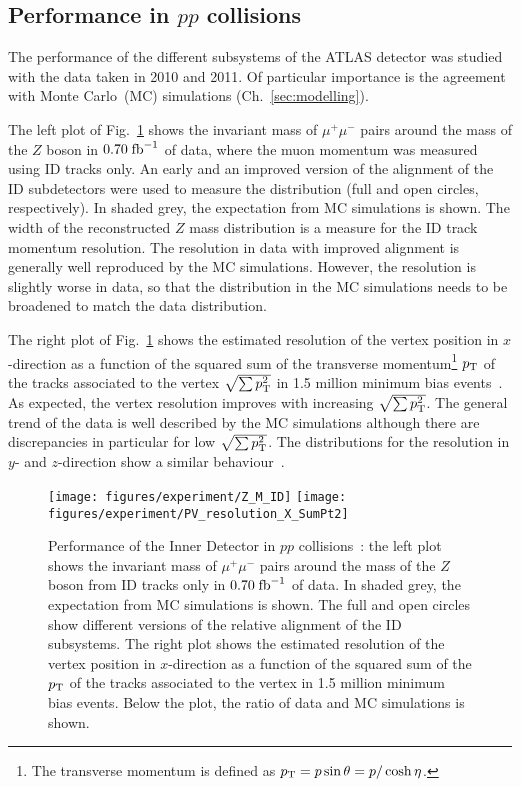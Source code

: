 \subsection[Performance in $pp$ collisions]{Performance in \boldmath$pp$ collisions\unboldmath}
\label{sec:performance}

The performance of the different subsystems of the ATLAS detector was studied with the data taken in 2010 and 2011.
Of particular importance is the agreement with Monte Carlo~(MC) simulations (Ch.~\ref{sec:modelling}).

The left plot of Fig.~\ref{fig:IDperformance} shows the invariant mass of $\mu^+\mu^-$ pairs around the mass of the $Z$ boson in \mbox{$0.70 \; \mathrm{fb}^{-1}$} of data,
where the muon momentum was measured using ID tracks only.
An early and an improved version of the alignment of the ID subdetectors were used to measure the distribution (full and open circles,
respectively).
In shaded grey, the expectation from MC simulations is shown.
The width of the reconstructed $Z$ mass distribution is a measure for the ID track momentum resolution.
The resolution in data with improved alignment is generally well reproduced by the MC simulations.
However, the resolution is slightly worse in data, so that the distribution in the MC simulations needs to be broadened to match the
data distribution.

The right plot of Fig.~\ref{fig:IDperformance} shows the estimated resolution of the vertex position in $x$-direction as a function of the squared sum
of the transverse momentum\footnote{The transverse momentum is defined as \mbox{$p_{\mathrm{T}} = p \sin \theta = p / \cosh \eta$}.}
$p_{\mathrm{T}}$ of the tracks associated to the vertex $\sqrt{\sum p_{\mathrm{T}}^2}$ in 1.5 million minimum bias events~\cite{ATLASminbias}.
As expected, the vertex resolution improves with increasing $\sqrt{\sum p_{\mathrm{T}}^2}$.
The general trend of the data is well described by the MC simulations although there are discrepancies in particular for low $\sqrt{\sum p_{\mathrm{T}}^2}$.
The distributions for the resolution in $y$- and $z$-direction show a similar behaviour~\cite{idperformance}.

\begin{figure}[h!]
\begin{center}
\texttt{[image: figures/experiment/Z\_M\_ID]}
\texttt{[image: figures/experiment/PV\_resolution\_X\_SumPt2]}
\caption[Performance of the Inner Detector]{
  Performance of the Inner Detector in $pp$ collisions~\cite{idperformance}:
  the left plot shows the invariant mass of $\mu^+\mu^-$ pairs around the mass of the $Z$ boson from ID tracks only in \mbox{$0.70 \; \mathrm{fb}^{-1}$} of data.
  In shaded grey, the expectation from MC simulations is shown. The full and open circles show different versions of the relative alignment
  of the ID subsystems.
  The right plot shows the estimated resolution of the vertex position in $x$-direction as a function of the squared sum of the $p_{\mathrm{T}}$ of the tracks
  associated to the vertex in 1.5 million minimum bias events.
  Below the plot, the ratio of data and MC simulations is shown.
}
\label{fig:IDperformance}
\end{center}
\end{figure}

